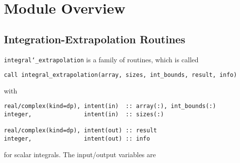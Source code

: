 \documentclass[12pt,a4paper]{article}
\begin{document}
\section{Module Overview}

\subsection{Integration-Extrapolation Routines}
{\tt integral\char`_extrapolation} is a family of routines, which is called
\begin{verbatim}
call integral_extrapolation(array, sizes, int_bounds, result, info)
\end{verbatim}
with
\begin{verbatim}
real/complex(kind=dp), intent(in)  :: array(:), int_bounds(:)
integer,               intent(in)  :: sizes(:)
    
real/complex(kind=dp), intent(out) :: result
integer,               intent(out) :: info
\end{verbatim}
for scalar integrals. The input/output variables are
\end{document}
